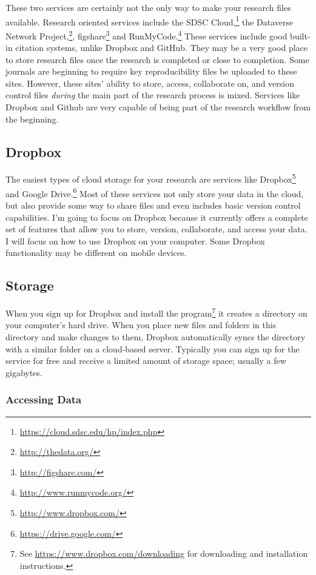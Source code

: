 These two services are certainly not the only way to make your research files available. Research oriented services include the SDSC Cloud,\footnote{\url{https://cloud.sdsc.edu/hp/index.php}} the Dataverse Network Project,\footnote{\url{http://thedata.org/}}, figshare\footnote{\url{http://figshare.com/}} and RunMyCode.\footnote{\url{http://www.runmycode.org/}} These services include good built-in citation systems, unlike Dropbox and GitHub. They may be a very good place to store research files once the research is completed or close to completion. Some journals are beginning to require key reproducibility files be uploaded to these sites. However, these sites' ability to store, access, collaborate on, and version control files \emph{during} the main part of the research process is mixed. Services like Dropbox and Github are very capable of being part of the research workflow from the beginning.

\subsection{Dropbox}

The easiest types of cloud storage for your research are services like Dropbox\footnote{\url{http://www.dropbox.com/}} and Google  Drive.\footnote{\url{https://drive.google.com/}} Most of these services not only store your data in the cloud, but also provide some way to share files and even includes basic version control capabilities. I'm going to focus on Dropbox because it currently offers a complete set of features that allow you to store, version, collaborate, and access your data. I will focus on how to use Dropbox on your computer. Some Dropbox functionality may be different on mobile devices.

\subsection{Storage}

When you sign up for Dropbox and install the program\footnote{See \url{https://www.dropbox.com/downloading} for downloading and installation instructions.} it creates a directory on your computer's hard drive. When you place new files and folders in this directory and make changes to them, Dropbox automatically syncs the directory with a similar folder on a cloud-based server. Typically you can sign up for the service for free and receive a limited amount of storage space; usually a few gigabytes.

\subsubsection{Accessing Data}

